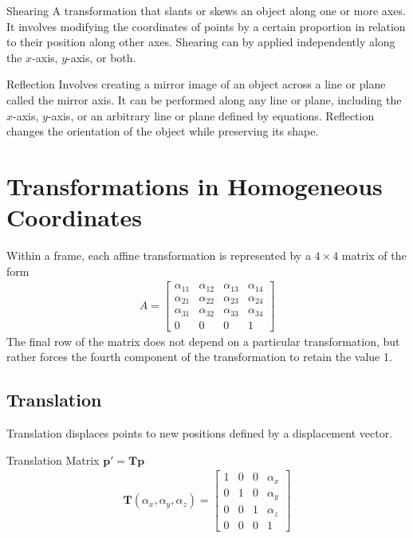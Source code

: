 \documentclass[../COS3712_Notes.tex]{subfiles}
\begin{document}
      \begin{definition}{Shearing}
        A transformation that slants or skews an object along one or more axes.
        It involves modifying the coordinates of points by a certain proportion
        in relation to their position along other axes.
        Shearing can by applied independently along the $x$-axis, $y$-axis, or both.
      \end{definition}

      \begin{definition}{Reflection}
        Involves creating a mirror image of an object across a line or plane called the mirror axis.
        It can be performed along any line or plane, including the $x$-axis, $y$-axis,
        or an arbitrary line or plane defined by equations.
        Reflection changes the orientation of the object while preserving its shape.
      \end{definition}

    \section{Transformations in Homogeneous Coordinates}
      Within a frame, each affine transformation is represented by a $4 \times 4$ matrix of the form
      \begin{align*}
        A = \begin{bmatrix}
          \alpha_{11} & \alpha_{12} & \alpha_{13} & \alpha_{14} \\
          \alpha_{21} & \alpha_{22} & \alpha_{23} & \alpha_{24} \\
          \alpha_{31} & \alpha_{32} & \alpha_{33} & \alpha_{34} \\
          0 & 0 & 0 & 1
        \end{bmatrix}
      \end{align*}
      The final row of the matrix does not depend on a particular transformation,
      but rather forces the fourth component of the transformation to retain the value 1.

      \pagebreak

      \subsection{Translation}
        Translation displaces points to new positions defined by a displacement vector.

        \begin{theorem}{Translation Matrix}
          $\mathbf{p}' = \mathbf{Tp}$
          \begin{align*}
            \mathbf{T}(\alpha_x, \alpha_y, \alpha_z) = \begin{bmatrix}
              1 & 0 & 0 & \alpha_x \\
              0 & 1 & 0 & \alpha_y \\
              0 & 0 & 1 & \alpha_z \\
              0 & 0 & 0 & 1
            \end{bmatrix}
          \end{align*}
        \end{theorem}
\end{document}

